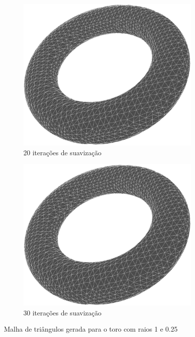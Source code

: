 \documentclass[11pt]{article}
\begin{document}
\begin{figure}
			\begin{subfigure}[b]{0.45\textwidth}
				\centering
				\includegraphics[width=\textwidth]{figures/20iter_torus_mesh}
				\caption{20 iterações de suavização}				
			\end{subfigure}
			\begin{subfigure}[b]{0.45\textwidth}
				\centering
				\includegraphics[width=\textwidth]{figures/30iter_torus_mesh}
				\caption{30 iterações de suavização}				
			\end{subfigure}
			\caption{Malha de triângulos gerada para o toro com raios 1 e 0.25}
			\label{fig:mesh:torus}
		\end{figure}
\end{document}
